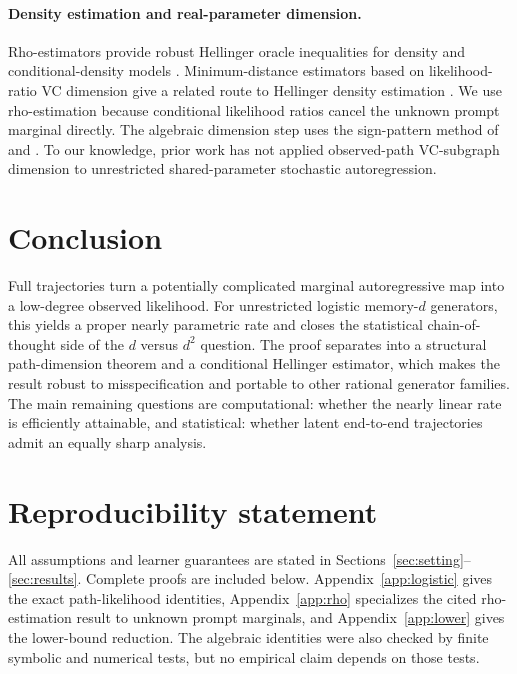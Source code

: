 \documentclass{article}
\theoremstyle{definition}
\theoremstyle{remark}
\begin{document}
\paragraph{Density estimation and real-parameter dimension.} Rho-estimators provide robust Hellinger oracle inequalities for density and conditional-density models \citep{baraud2018rho}. Minimum-distance estimators based on likelihood-ratio VC dimension give a related route to Hellinger density estimation \citep{compton2026density}. We use rho-estimation because conditional likelihood ratios cancel the unknown prompt marginal directly. The algebraic dimension step uses the sign-pattern method of \citet{warren1968lower} and \citet{goldberg1995bounding}. To our knowledge, prior work has not applied observed-path VC-subgraph dimension to unrestricted shared-parameter stochastic autoregression.

\section{Conclusion}

Full trajectories turn a potentially complicated marginal autoregressive map into a low-degree observed likelihood. For unrestricted logistic memory-$d$ generators, this yields a proper nearly parametric rate and closes the statistical chain-of-thought side of the $d$ versus $d^2$ question. The proof separates into a structural path-dimension theorem and a conditional Hellinger estimator, which makes the result robust to misspecification and portable to other rational generator families. The main remaining questions are computational: whether the nearly linear rate is efficiently attainable, and statistical: whether latent end-to-end trajectories admit an equally sharp analysis.

\section*{Reproducibility statement}

All assumptions and learner guarantees are stated in Sections~\ref{sec:setting}--\ref{sec:results}. Complete proofs are included below. Appendix~\ref{app:logistic} gives the exact path-likelihood identities, Appendix~\ref{app:rho} specializes the cited rho-estimation result to unknown prompt marginals, and Appendix~\ref{app:lower} gives the lower-bound reduction. The algebraic identities were also checked by finite symbolic and numerical tests, but no empirical claim depends on those tests.
\end{document}
